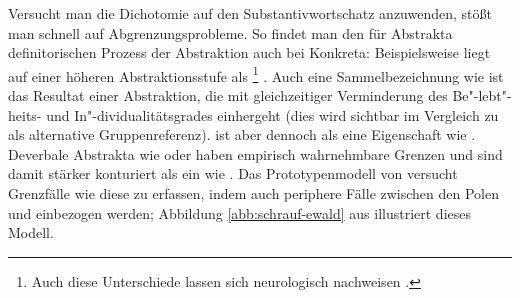 Versucht man die Dichotomie  auf den Substantivwortschatz  anzuwenden, stößt man schnell auf Abgrenzungsprobleme. So findet man den für Abstrakta  definitorischen Prozess der Abstraktion auch bei  Konkreta: Beispielsweise liegt  auf einer höheren Abstraktionsstufe als \footnote{Auch diese Unterschiede lassen sich neurologisch nachweisen \parencite[s.][]{Ghio2013}.} \parencite[274]{Ewald1992}. Auch eine Sammelbezeichnung wie  ist das Resultat einer Abstraktion, die mit gleichzeitiger Verminderung des Be"-lebt"-heits- und In"-dividualitätsgrades einhergeht (dies wird sichtbar im Vergleich zu  als alternative Gruppenreferenz).  ist aber dennoch  als eine Eigenschaft wie . Deverbale Abstrakta  wie  oder  haben empirisch wahrnehmbare Grenzen und sind damit stärker konturiert als ein  wie . Das Prototypenmodell von \textcite[279--280]{Ewald1992} versucht Grenzfälle wie diese zu erfassen, indem auch periphere Fälle zwischen den Polen   und   einbezogen werden; Abbildung \ref{abb:schrauf-ewald} aus \textcite{Schrauf2011} illustriert dieses Modell.  

